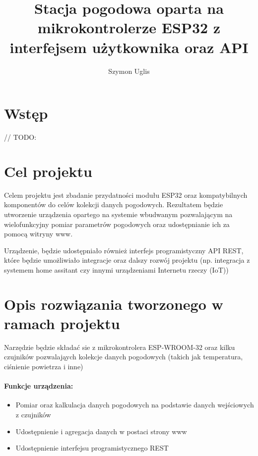 \documentclass[12pt,a4paper]{article}
\title{Stacja pogodowa oparta na mikrokontrolerze ESP32 z interfejsem użytkownika oraz API}
\author{Szymon Uglis}
\begin{document}
\begin{titlepage}
    \maketitle
\end{titlepage}

\tableofcontents{}
\pagebreak

\section{Wstęp}

// TODO:

\section{Cel projektu}

Celem projektu jest zbadanie przydatności modułu ESP32 oraz kompatybilnych komponentów do celów kolekcji danych pogodowych. 
Rezultatem będzie utworzenie urządzenia opartego na systemie wbudwanym pozwalającym na wielofunkcyjny pomiar parametrów pogodowych oraz udostępnianie ich za pomocą witryny www.

Urządzenie, będzie udostępniało również interfejs programistyczny API REST, które będzie umożliwiało integracje oraz dalszy rozwój projektu 
(np. integracja z systemem home assitant czy innymi urządzeniami Internetu rzeczy (IoT))

\section{Opis rozwiązania tworzonego w ramach projektu}

Narzędzie będzie składać sie z mikrokontrolera ESP-WROOM-32 oraz kilku czujników pozwalająych kolekcje danych pogodowych (takich jak temperatura, ciśnienie powietrza i inne)

\paragraph{Funkcje urządzenia:}
\begin{itemize}
    \item Pomiar oraz kalkulacja danych pogodowych na podstawie danych wejściowych z czujników
    \item Udostępnienie i agregacja danych w postaci strony www
    \item Udostępnienie interfejsu programistycznego REST 
\end{itemize}
\end{document}
